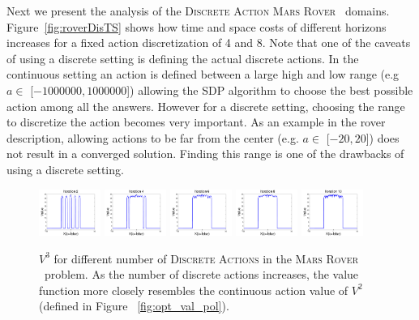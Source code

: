 \documentclass[twoside,11pt]{article}
\newcommand{\MarsRover}{\textsc{Mars Rover }}
\begin{document}
Next we present the analysis of the \textsc{Discrete Action} \MarsRover\ domains. Figure~\ref{fig:roverDisTS} shows how time and space costs of different horizons increases for a fixed action discretization of 4 and 8.
Note that one of the caveats of using a discrete setting is defining the actual discrete actions. In the continuous setting an action is defined between a large high and low range (e.g $a \in$ [$-1000000,1000000$]) allowing the SDP algorithm to choose the best possible action among all the answers. However for a discrete setting, choosing the range to discretize the action becomes very important. As an example in the rover description, allowing actions to be far from the center (e.g. $a \in$ [$-20,20$]) does not result in a converged solution. Finding this range is one of the drawbacks of using a discrete setting. 

\begin{figure}[tbp!]
\vspace{-2mm}
\centering
\includegraphics[width=0.18\textwidth]{pics/rover2.pdf}
\includegraphics[width=0.18\textwidth]{pics/rover4.pdf}
\includegraphics[width=0.18\textwidth]{pics/rover6.pdf}
\includegraphics[width=0.18\textwidth]{pics/rover8.pdf}
\includegraphics[width=0.18\textwidth]{pics/rover10.pdf}

\vspace{-2mm}
\caption{%
$V^3$ for different number of \textsc{Discrete Actions} in the \MarsRover\ problem. As the number of discrete actions increases, the value function more closely resembles the continuous action value of $V^2$ (defined in Figure ~\ref{fig:opt_val_pol}).
}
\label{fig:rover_discrete}
\vspace{-1mm}
\end{figure}
\end{document}
